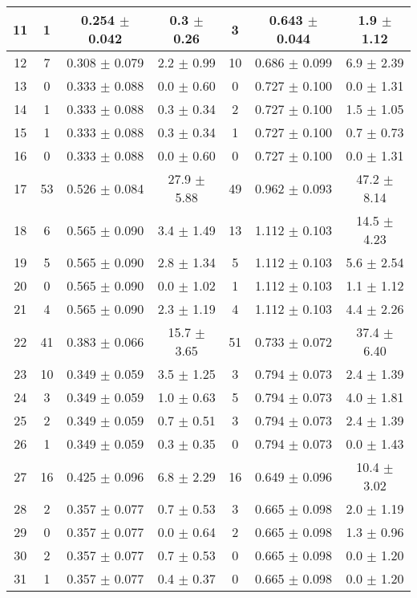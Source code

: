 \begin{table}[h!]
\begin{tabular}{c|c|c|c|c|c|c}
11 & 1  & 0.254  $\pm$  0.042  & 0.3 $\pm$ 0.26 & 3  & 0.643  $\pm$  0.044  & 1.9 $\pm$ 1.12    \\\hline
12 & 7  & 0.308  $\pm$  0.079  & 2.2 $\pm$ 0.99 & 10  & 0.686  $\pm$  0.099  & 6.9 $\pm$ 2.39    \\\hline
13 & 0  & 0.333  $\pm$  0.088  & 0.0 $\pm$ 0.60 & 0  & 0.727  $\pm$  0.100  & 0.0 $\pm$ 1.31    \\\hline
14 & 1  & 0.333  $\pm$  0.088  & 0.3 $\pm$ 0.34 & 2  & 0.727  $\pm$  0.100  & 1.5 $\pm$ 1.05    \\\hline
15 & 1  & 0.333  $\pm$  0.088  & 0.3 $\pm$ 0.34 & 1  & 0.727  $\pm$  0.100  & 0.7 $\pm$ 0.73    \\\hline
16 & 0  & 0.333  $\pm$  0.088  & 0.0 $\pm$ 0.60 & 0  & 0.727  $\pm$  0.100  & 0.0 $\pm$ 1.31    \\\hline
17 & 53  & 0.526  $\pm$  0.084  & 27.9 $\pm$ 5.88 & 49  & 0.962  $\pm$  0.093  & 47.2 $\pm$ 8.14    \\\hline
18 & 6  & 0.565  $\pm$  0.090  & 3.4 $\pm$ 1.49 & 13  & 1.112  $\pm$  0.103  & 14.5 $\pm$ 4.23    \\\hline
19 & 5  & 0.565  $\pm$  0.090  & 2.8 $\pm$ 1.34 & 5  & 1.112  $\pm$  0.103  & 5.6 $\pm$ 2.54    \\\hline
20 & 0  & 0.565  $\pm$  0.090  & 0.0 $\pm$ 1.02 & 1  & 1.112  $\pm$  0.103  & 1.1 $\pm$ 1.12    \\\hline
21 & 4  & 0.565  $\pm$  0.090  & 2.3 $\pm$ 1.19 & 4  & 1.112  $\pm$  0.103  & 4.4 $\pm$ 2.26    \\\hline
22 & 41  & 0.383  $\pm$  0.066  & 15.7 $\pm$ 3.65 & 51  & 0.733  $\pm$  0.072  & 37.4 $\pm$ 6.40    \\\hline
23 & 10  & 0.349  $\pm$  0.059  & 3.5 $\pm$ 1.25 & 3  & 0.794  $\pm$  0.073  & 2.4 $\pm$ 1.39    \\\hline
24 & 3  & 0.349  $\pm$  0.059  & 1.0 $\pm$ 0.63 & 5  & 0.794  $\pm$  0.073  & 4.0 $\pm$ 1.81    \\\hline
25 & 2  & 0.349  $\pm$  0.059  & 0.7 $\pm$ 0.51 & 3  & 0.794  $\pm$  0.073  & 2.4 $\pm$ 1.39    \\\hline
26 & 1  & 0.349  $\pm$  0.059  & 0.3 $\pm$ 0.35 & 0  & 0.794  $\pm$  0.073  & 0.0 $\pm$ 1.43    \\\hline
27 & 16  & 0.425  $\pm$  0.096  & 6.8 $\pm$ 2.29 & 16  & 0.649  $\pm$  0.096  & 10.4 $\pm$ 3.02    \\\hline
28 & 2  & 0.357  $\pm$  0.077  & 0.7 $\pm$ 0.53 & 3  & 0.665  $\pm$  0.098  & 2.0 $\pm$ 1.19    \\\hline
29 & 0  & 0.357  $\pm$  0.077  & 0.0 $\pm$ 0.64 & 2  & 0.665  $\pm$  0.098  & 1.3 $\pm$ 0.96    \\\hline
30 & 2  & 0.357  $\pm$  0.077  & 0.7 $\pm$ 0.53 & 0  & 0.665  $\pm$  0.098  & 0.0 $\pm$ 1.20    \\\hline
31 & 1  & 0.357  $\pm$  0.077  & 0.4 $\pm$ 0.37 & 0  & 0.665  $\pm$  0.098  & 0.0 $\pm$ 1.20    \\\hline
\end{tabular}
\end{table}


